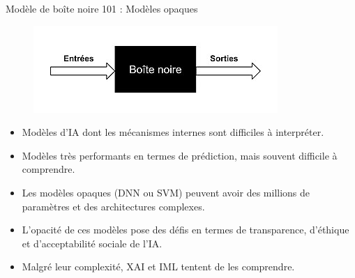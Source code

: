 \documentclass{beamer}
\begin{document}
\begin{frame}{Modèle de boîte noire 101 : Modèles opaques}
\begin{center}
	\begin{figure}
			\includegraphics[width=0.6\linewidth]{350px-Schéma_d'une_boîte_noire.jpg}
	\end{figure}
\end{center}
	\begin{itemize}
		\item Modèles d'IA dont les mécanismes internes sont difficiles à interpréter.
		\item Modèles très performants en termes de prédiction, mais souvent difficile à comprendre.
		\item Les modèles opaques (DNN ou SVM) peuvent avoir des millions de paramètres et des architectures complexes.
		\item L'opacité de ces modèles pose des défis en termes de transparence, d'éthique et d'acceptabilité sociale de l'IA.
		\item Malgré leur complexité, XAI et IML tentent de les comprendre.
	\end{itemize}

\end{frame}
\end{document}
